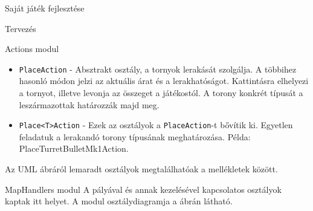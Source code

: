 \begin{MyChapter}{Saját játék fejlesztése}
\begin{MySection}{Tervezés}
\begin{MySubSection}{Actions modul}
\begin{itemize}
				\item \texttt{PlaceAction} - Absztrakt osztály, a tornyok lerakását szolgálja. A többihez hasonló módon jelzi az aktuális árat és a lerakhatóságot. Kattintásra elhelyezi a tornyot, illetve levonja az összeget a játékostól. A torony konkrét típusát a leszármazottak határozzák majd meg.
				
				\item \texttt{Place<T>Action} - Ezek az osztályok a \texttt{PlaceAction}-t bővítik ki. Egyetlen feladatuk a lerakandó torony típusának meghatározása. Példa: PlaceTurretBulletMk1Action.
			\end{itemize}
			
			Az UML ábráról lemaradt osztályok megtalálhatóak a mellékletek között.
		\end{MySubSection}
	
		\begin{MySubSection}{MapHandlers modul}
			A pályával és annak kezelésével kapcsolatos osztályok kaptak itt helyet.
			A modul osztálydiagramja a  ábrán látható.
			

\end{MySubSection}
\end{MySection}
\end{MyChapter}
